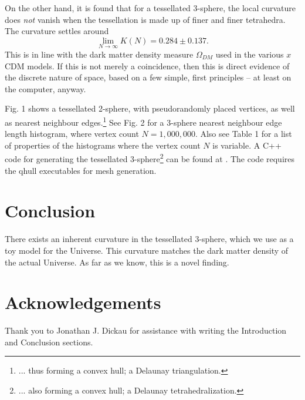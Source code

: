 \documentclass[12pt]{article}
\begin{document}
On the other hand, it is found that for a tessellated 3-sphere, the local curvature does {\it not} vanish when the tessellation is made up of finer and finer tetrahedra.
The curvature settles around
\begin{equation}
\lim_{N \to \infty} K(N) = 0.284 \pm 0.137.
\end{equation}
This is in line with the dark matter density measure $\Omega_{DM}$ used in the various $x$CDM models.
If this is not merely a coincidence, then this is direct evidence of the discrete nature of space, based on a few simple, first principles -- at least on the computer, anyway.

Fig. 1 shows a tessellated 2-sphere, with pseudorandomly placed vertices, as well as nearest neighbour edges.\footnote{... thus forming a convex hull; a Delaunay triangulation.}
See Fig. 2 for a 3-sphere nearest neighbour edge length histogram, where vertex count $N = 1,000,000$.
Also see Table 1 for a list of properties of the histograms where the vertex count $N$ is variable.
A C++ code for generating the tessellated 3-sphere\footnote{... also forming a convex hull; a Delaunay tetrahedralization.} can be found at \cite{halayka2}.
The code requires the qhull executables for mesh generation.



\section{Conclusion}

There exists an inherent curvature in the tessellated 3-sphere, which we use as a toy model for the Universe.
This curvature matches the dark matter density of the actual Universe.
As far as we know, this is a novel finding.



\section { Acknowledgements }
Thank you to Jonathan J. Dickau for assistance with writing the Introduction and Conclusion sections.
\end{document}
